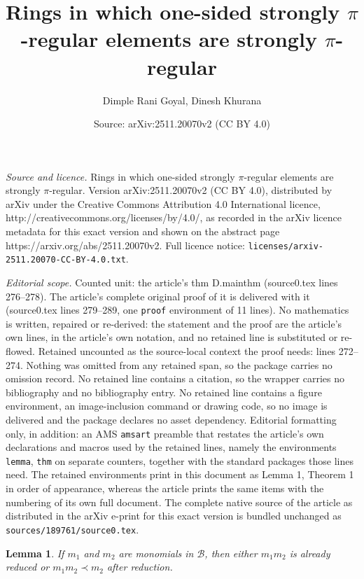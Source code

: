 \documentclass[10pt,a4paper]{amsart}
\title{Rings in which one-sided strongly $\pi$-regular elements are strongly $\pi$-regular}
\author{Dimple Rani Goyal, Dinesh Khurana}
\date{Source: arXiv:2511.20070v2 (CC BY 4.0)}
\newtheorem{lemma}{Lemma}
\begin{document}
\maketitle

\noindent\emph{Source and licence.} Rings in which one-sided strongly $\pi$-regular elements are strongly $\pi$-regular. Version arXiv:2511.20070v2 (CC BY 4.0), distributed by arXiv under the Creative Commons Attribution 4.0 International licence, http://creativecommons.org/licenses/by/4.0/, as recorded in the arXiv licence metadata for this exact version and shown on the abstract page https://arxiv.org/abs/2511.20070v2. Full licence notice: \texttt{licenses/arxiv-2511.20070-CC-BY-4.0.txt}.\par\smallskip

\noindent\textit{Editorial scope.} Counted unit: the article's thm D.mainthm (source0.tex lines 276--278). The article's complete original proof of it is delivered with it (source0.tex lines 279--289, one \texttt{proof} environment of 11 lines). No mathematics is written, repaired or re-derived: the statement and the proof are the article's own lines, in the article's own notation, and no retained line is substituted or re-flowed.  Retained uncounted as the source-local context the proof needs: lines 272--274.  Nothing was omitted from any retained span, so the package carries no omission record.  No retained line contains a citation, so the wrapper carries no bibliography and no bibliography entry.  No retained line contains a figure environment, an image-inclusion command or drawing code, so no image is delivered and the package declares no asset dependency.  Editorial formatting only, in addition: an AMS \texttt{amsart} preamble that restates the article's own declarations and macros used by the retained lines, namely the environments \texttt{lemma}, \texttt{thm} on separate counters, together with the standard packages those lines need.  The retained environments print in this document as Lemma 1, Theorem 1 in order of appearance, whereas the article prints the same items with the numbering of its own full document.  The complete native source of the article as distributed in the arXiv e-print for this exact version is bundled unchanged as \texttt{sources/189761/source0.tex}.
	\begin{lemma}\label{D.mainlemma}
		If $m_1$ and $m_2$ are monomials in $\mathcal{B}$, then either $m_1m_2$ is already reduced or $m_1m_2 \prec m_2$ after reduction. 
	\end{lemma} 
\end{document}
